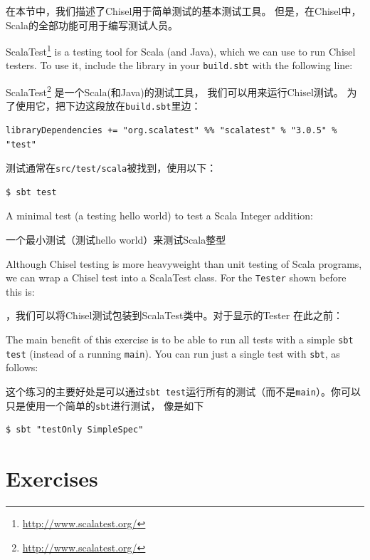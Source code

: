 \documentclass[%
    10pt,
    headinclude, footexclude,
    openright, %
    notitlepage,
    cleardoubleempty,
    headsepline,
    pointlessnumbers,
    bibtotoc, idxtotoc,
    ]{scrbook}
\newcommand{\code}[1]{{\small{\texttt{#1}}}}
\newcommand{\myref}[2]{\href{#1}{#2}}
\renewcommand{\myref}[2]{{#2}{\footnote{\url{#1}}}}
\begin{document}
在本节中，我们描述了Chisel用于简单测试的基本测试工具。
但是，在Chisel中，Scala的全部功能可用于编写测试人员。

\myref{http://www.scalatest.org/}{ScalaTest} is a testing tool for Scala (and Java),
which we can use to run Chisel testers.
To use it, include the library in your \code{build.sbt} with the following line:

\myref{http://www.scalatest.org/}{ScalaTest} 是一个Scala(和Java)的测试工具，
我们可以用来运行Chisel测试。
为了使用它，把下边这段放在\code{build.sbt}里边：

\begin{verbatim}
libraryDependencies += "org.scalatest" %% "scalatest" % "3.0.5" % "test"
\end{verbatim}

\noindent 测试通常在\code{src/test/scala}被找到，使用以下：

\begin{verbatim}
$ sbt test
\end{verbatim}

\noindent A minimal test (a testing hello world) to test a Scala Integer
addition:

\noindent 一个最小测试（测试hello world）来测试Scala整型


\noindent Although Chisel testing is more heavyweight than unit testing of Scala programs,
we can wrap a Chisel test into a ScalaTest class. For the \code{Tester} shown
before this is:

，我们可以将Chisel测试包装到ScalaTest类中。对于显示的Tester
在此之前：


The main benefit of this exercise is to be able to run all tests with a simple
\code{sbt test} (instead of a running \code{main}). You can run just a single
test with \code{sbt}, as follows:

这个练习的主要好处是可以通过\code{sbt test}运行所有的测试（而不是\code{main}）。你可以只是使用一个简单的\code{sbt}进行测试，
像是如下

\begin{verbatim}
$ sbt "testOnly SimpleSpec"
\end{verbatim}

\section{Exercises}
\end{document}
